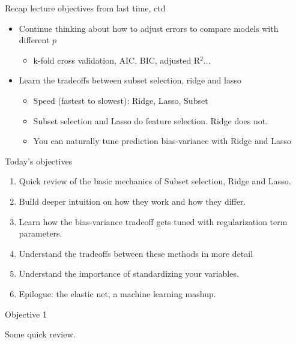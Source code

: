 \documentclass[mathserif, aspectratio=169]{beamer}
\begin{document}
\begin{frame}{Recap lecture objectives from last time, ctd}
\begin{itemize}
\item Continue thinking about how to adjust errors to compare models with different $p$
\begin{itemize}
\item<2-> k-fold cross validation, AIC, BIC, adjusted R$^2$...
\end{itemize}

\vspace{5mm}
\item Learn the tradeoffs between subset selection, ridge and lasso
\begin{itemize}
\item<3-> Speed (fastest to slowest): Ridge, Lasso, Subset
\item<3-> Subset selection and Lasso do feature selection.  Ridge does not.
\item<3-> You can naturally tune prediction bias-variance with Ridge and Lasso
\end{itemize}
\end{itemize}
\end{frame}

\begin{frame}{Today's objectives}

\begin{enumerate}
\item Quick review of the basic mechanics of Subset selection, Ridge and Lasso.
\item Build deeper intuition on how they work and how they differ.
\item Learn how the bias-variance tradeoff gets tuned with regularization term parameters. 
\item Understand the tradeoffs between these methods in more detail
\item Understand the importance of standardizing your variables.
\item Epilogue: the elastic net, a machine learning mashup.  
\end{enumerate}

\end{frame}

\begin{frame}{Objective 1}

Some quick review.

\end{frame}
\end{document}
